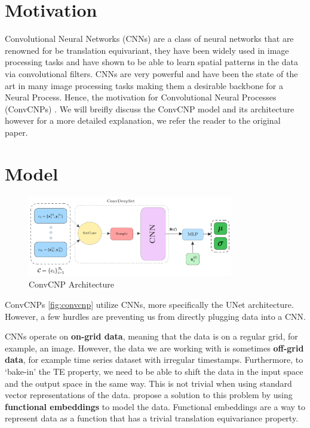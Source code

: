 \documentclass[../../main.tex]{subfiles}
\begin{document}
\section{Motivation}

Convolutional Neural Networks (CNNs) are a class of neural networks that are renowned for be translation equivariant, they have been widely used in image processing tasks and have shown to be able to learn spatial patterns in the data via convolutional filters. CNNs are very powerful and have been the state of the art in many image processing tasks making them a desirable backbone for a Neural Process. Hence, the motivation for Convolutional Neural Processes (ConvCNPs) \parencite{gordon2020convolutional}. We will breifly discuss the ConvCNP model and its architecture however for a more detailed explanation, we refer the reader to the original paper.

\section{Model}

\begin{figure}[H]
	\centering
	\includegraphics[width=0.8\textwidth]{convcnp.png}
	\caption{ConvCNP Architecture}
	\label{fig:convcnp}
\end{figure}


ConvCNPs \parencite{gordon2020convolutional} \autoref{fig:convcnp} utilize CNNs, more specifically the UNet architecture. However, a few hurdles are preventing us from directly plugging data into a CNN.


CNNs operate on \textbf{on-grid data}, meaning that the data is on a regular grid, for example, an image. However, the data we are working with is sometimes \textbf{off-grid data}, for example time series dataset with irregular timestamps. Furthermore, to `bake-in' the TE property, we need to be able to shift the data in the input space and the output space in the same way. This is not trivial when using standard vector representations of the data. \parencite{gordon2020convolutional} propose a solution to this problem by using \textbf{functional embeddings} to model the data. Functional embeddings are a way to represent data as a function that has a trivial translation equivariance property. 
\end{document}
